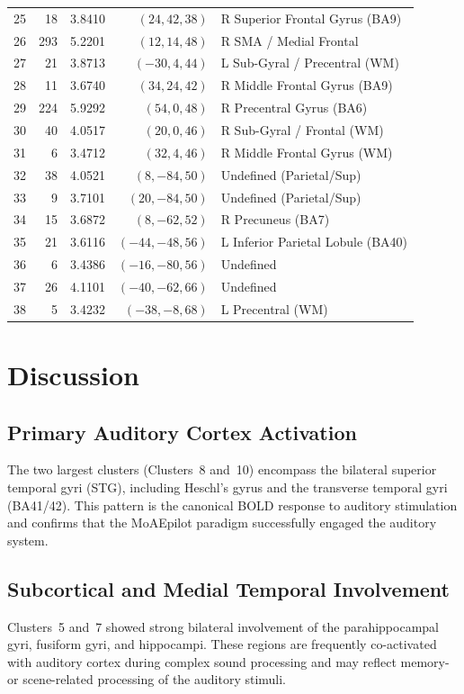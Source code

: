 \documentclass[11pt,a4paper]{article}
\begin{document}
\begin{longtable}{@{}r r r r l@{}}
25 & 18   & 3.8410  & $(24, 42, 38)$     & R Superior Frontal Gyrus (BA9) \\
26 & 293  & 5.2201  & $(12, 14, 48)$     & R SMA / Medial Frontal \\
27 & 21   & 3.8713  & $(-30, 4, 44)$     & L Sub-Gyral / Precentral (WM) \\
28 & 11   & 3.6740  & $(34, 24, 42)$     & R Middle Frontal Gyrus (BA9) \\
29 & 224  & 5.9292  & $(54, 0, 48)$      & R Precentral Gyrus (BA6) \\
30 & 40   & 4.0517  & $(20, 0, 46)$      & R Sub-Gyral / Frontal (WM) \\
31 & 6    & 3.4712  & $(32, 4, 46)$      & R Middle Frontal Gyrus (WM) \\
32 & 38   & 4.0521  & $(8, -84, 50)$     & Undefined (Parietal/Sup) \\
33 & 9    & 3.7101  & $(20, -84, 50)$    & Undefined (Parietal/Sup) \\
34 & 15   & 3.6872  & $(8, -62, 52)$     & R Precuneus (BA7) \\
35 & 21   & 3.6116  & $(-44, -48, 56)$   & L Inferior Parietal Lobule (BA40) \\
36 & 6    & 3.4386  & $(-16, -80, 56)$   & Undefined \\
37 & 26   & 4.1101  & $(-40, -62, 66)$   & Undefined \\
38 & 5    & 3.4232  & $(-38, -8, 68)$    & L Precentral (WM) \\
\end{longtable}

\section{Discussion}

\subsection{Primary Auditory Cortex Activation}
The two largest clusters (Clusters~8 and~10) encompass the bilateral superior temporal gyri (STG), including Heschl's gyrus and the transverse temporal gyri (BA41/42). This pattern is the canonical BOLD response to auditory stimulation and confirms that the MoAEpilot paradigm successfully engaged the auditory system.

\subsection{Subcortical and Medial Temporal Involvement}
Clusters~5 and~7 showed strong bilateral involvement of the parahippocampal gyri, fusiform gyri, and hippocampi. These regions are frequently co-activated with auditory cortex during complex sound processing and may reflect memory- or scene-related processing of the auditory stimuli.
\end{document}
